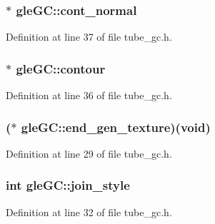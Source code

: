 \hypertarget{structgle_g_c_ac5f353ce5d2a7be0a37e7334aded8128}{
\subsubsection[{cont\-\_\-normal}]{$\ast$ gle\-G\-C\-::cont\-\_\-normal}}\label{structgle_g_c_ac5f353ce5d2a7be0a37e7334aded8128}


Definition at line 37 of file tube\-\_\-gc.\-h.

\hypertarget{structgle_g_c_ac331873a1785cfcfaadc51d6d48faf9f}{
\subsubsection[{contour}]{$\ast$ gle\-G\-C\-::contour}}\label{structgle_g_c_ac331873a1785cfcfaadc51d6d48faf9f}


Definition at line 36 of file tube\-\_\-gc.\-h.

\hypertarget{structgle_g_c_a661bd718e7c074d2b17ff0870ec55cbd}{
\subsubsection[{end\-\_\-gen\-\_\-texture}]{($\ast$ gle\-G\-C\-::end\-\_\-gen\-\_\-texture)({\bf void})}}\label{structgle_g_c_a661bd718e7c074d2b17ff0870ec55cbd}


Definition at line 29 of file tube\-\_\-gc.\-h.

\hypertarget{structgle_g_c_a334385e55e758b8988460d251531ea1f}{
\subsubsection[{join\-\_\-style}]{\setlength{\rightskip}{0pt plus 5cm}int gle\-G\-C\-::join\-\_\-style}}\label{structgle_g_c_a334385e55e758b8988460d251531ea1f}


Definition at line 32 of file tube\-\_\-gc.\-h.

